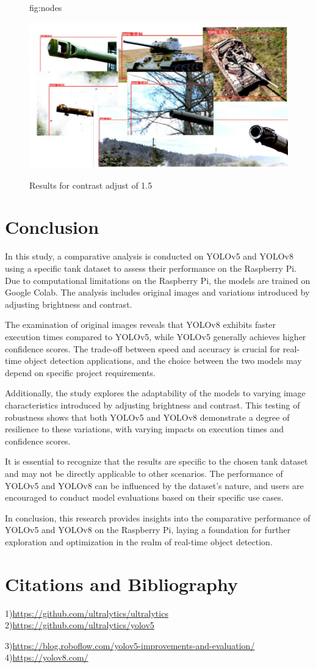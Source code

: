 \documentclass[pmlr,twocolumn,10pt]{jmlr} %
\begin{document}
\begin{figure}[htbp]
\floatconts
  {fig:nodes}
  {\caption{Results for contrast adjust of 1.5}}
  {\includegraphics[width=1\linewidth]{images/Yolo5Con15.jpg}}
\end{figure}

\section{Conclusion}
In this study, a comparative analysis is conducted on YOLOv5 and YOLOv8 using a specific tank dataset to assess their performance on the Raspberry Pi. Due to computational limitations on the Raspberry Pi, the models are trained on Google Colab. The analysis includes original images and variations introduced by adjusting brightness and contrast.

The examination of original images reveals that YOLOv8 exhibits faster execution times compared to YOLOv5, while YOLOv5 generally achieves higher confidence scores. The trade-off between speed and accuracy is crucial for real-time object detection applications, and the choice between the two models may depend on specific project requirements.

Additionally, the study explores the adaptability of the models to varying image characteristics introduced by adjusting brightness and contrast. This testing of robustness shows that both YOLOv5 and YOLOv8 demonstrate a degree of resilience to these variations, with varying impacts on execution times and confidence scores.

It is essential to recognize that the results are specific to the chosen tank dataset and may not be directly applicable to other scenarios. The performance of YOLOv5 and YOLOv8 can be influenced by the dataset's nature, and users are encouraged to conduct model evaluations based on their specific use cases.

In conclusion, this research provides insights into the comparative performance of YOLOv5 and YOLOv8 on the Raspberry Pi, laying a foundation for further exploration and optimization in the realm of real-time object detection.
\section{Citations and Bibliography}
1)\url{https://github.com/ultralytics/ultralytics}
2)\url{https://github.com/ultralytics/yolov5}

3)\url{https://blog.roboflow.com/yolov5-improvements-and-evaluation/}
4)\url{https://yolov8.com/}
\end{document}
